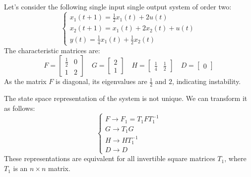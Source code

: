 \begin{example}
    Let's consider the following single input single output system of order two:
    \[\begin{cases}
        x_1(t+1)=\frac{1}{2}x_1(t)+2u(t) \\
        x_2(t+1)=x_1(t)+2x_2(t)+u(t) \\
        y(t)=\frac{1}{4}x_1(t)+\frac{1}{2}x_2(t)
    \end{cases}\]
    The characteristic matrices are:
    \[F=\begin{bmatrix} \frac{1}{2} & 0 \\ 1 & 2 \end{bmatrix} \quad G=\begin{bmatrix} 2 \\ 1 \end{bmatrix} \quad H=\begin{bmatrix} \frac{1}{4} & \frac{1}{2} \end{bmatrix} \quad D=\begin{bmatrix} 0 \end{bmatrix}\]
    As the matrix $F$ is diagonal, its eigenvalues are $\frac{1}{2}$ and $2$, indicating instability.
\end{example}
The state space representation of the system is not unique. 
We can transform it as follows:
\[\begin{cases}
    F \rightarrow F_1 = T_1 F T_1^{-1} \\ 
    G \rightarrow T_1 G \\
    H \rightarrow H T_1^{-1} \\ 
    D \rightarrow D
\end{cases}\]
These representations are equivalent for all invertible square matrices $T_1$, where $T_1$ is an $n \times n$ matrix.

